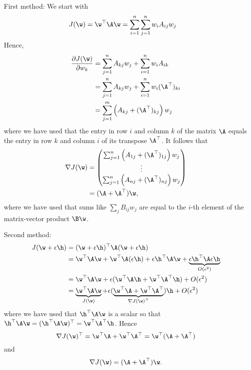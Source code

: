 \begin{exenumerate}
  \begin{solution}
    First method: We start with
    \begin{align}
      J(\w) &= \w^\top\A\w = \sum_{i=1}^n \sum_{j=1}^n w_iA_{ij}w_j
    \end{align}
    Hence,
    \begin{align}
      \frac{\partial{J(\w)}}{\partial{w_k}} &= \sum_{j=1}^n A_{kj}w_j + \sum_{i=1}^n w_i A_{ik} \\
                                            &= \sum_{j=1}^n A_{kj}w_j + \sum_{i=1}^n w_i (\A^\top)_{ki}\\
                                            &= \sum_{j=1}^m \left(A_{kj}+(\A^\top)_{kj}\right)w_j
    \end{align}
    where we have used that the entry in row $i$ and column $k$ of the matrix $\A$ equals the entry in row $k$ and column $i$ of its transpose $\A^\top$. It follows that
    \begin{align}
      \nabla J(\w) &=
                     \begin{pmatrix}
                       \sum_{j=1}^n  \left(A_{1j}+(\A^\top)_{1j}\right)w_j\\
                       \vdots \\
                       \sum_{j=1}^n  \left(A_{nj}+(\A^\top)_{nj}\right)w_j
                     \end{pmatrix} \\
                   &= (\A+\A^\top)\w,
    \end{align}
    where we have used that sums like $\sum_j B_{ij} w_j$ are equal to the $i$-th element of the matrix-vector product $\B \w$.

    Second method:
    \begin{align}
      J(\w + \epsilon\h) &= (\w + \epsilon\h)^\top \A(\w + \epsilon\h) \\
                         &= \w^\top\A\w + \w^\top\A(\epsilon\h) + \epsilon\h^\top\A\w +
                           \underbrace{\epsilon\h^\top \A\epsilon\h}_{O(\epsilon^2)} \\
                         &= \w^\top\A\w + \epsilon(\w^\top\A\h + \w^\top\A^\top\h) + O(\epsilon^2) \\
                         &= \underbrace{\w^\top\A\w}_{J(\w)} +\epsilon(\underbrace{\w^\top\A + \w^\top\A^\top}_{\nabla J(\w)^\top})\h + O(\epsilon^2)
    \end{align}
    where we have used that $\h^\top\A\w$ is a scalar so that $\h^\top\A\w = (\h^\top\A\w)^\top = \w^\top \A^\top \h$. Hence
    \begin{equation}
      \nabla J(\w)^\top = \w^\top\A + \w^\top\A^\top = \w^\top(\A+\A^\top)
    \end{equation}
    and
    \begin{equation}
      \nabla J(\w) = (\A + \A^\top)\w.
    \end{equation}
  \end{solution}


\end{exenumerate}
